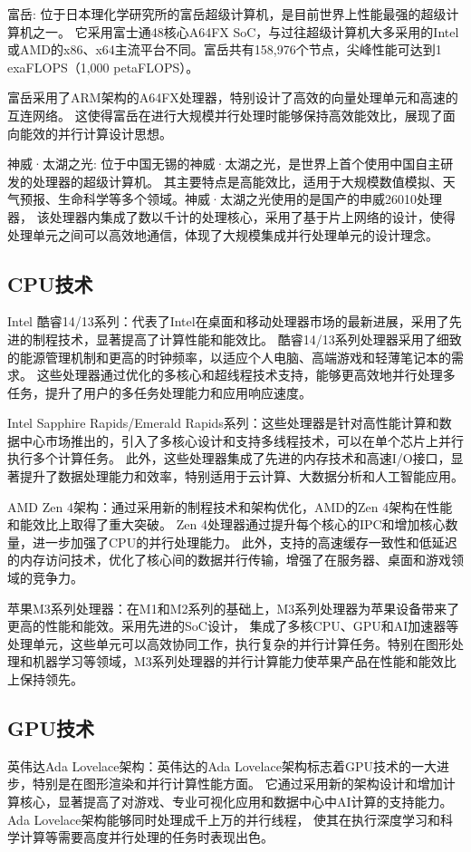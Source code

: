 \documentclass{ctexart}
\begin{document}
富岳: 位于日本理化学研究所的富岳超级计算机，是目前世界上性能最强的超级计算机之一。
它采用富士通48核心A64FX SoC，与过往超级计算机大多采用的Intel或AMD的x86、x64主流平台不同。富岳共有158,976个节点，尖峰性能可达到1 exaFLOPS（1,000 petaFLOPS）。\cite{fugaku1}

富岳采用了ARM架构的A64FX处理器，特别设计了高效的向量处理单元和高速的互连网络。\cite{fugaku2}
这使得富岳在进行大规模并行处理时能够保持高效能效比，展现了面向能效的并行计算设计思想。

神威·太湖之光: 位于中国无锡的神威·太湖之光，是世界上首个使用中国自主研发的处理器的超级计算机。
其主要特点是高能效比，适用于大规模数值模拟、天气预报、生命科学等多个领域。神威·太湖之光使用的是国产的申威26010处理器，
该处理器内集成了数以千计的处理核心，采用了基于片上网络的设计，使得处理单元之间可以高效地通信，体现了大规模集成并行处理单元的设计理念。
\subsection{CPU技术}
Intel 酷睿14/13系列：代表了Intel在桌面和移动处理器市场的最新进展，采用了先进的制程技术，显著提高了计算性能和能效比。
酷睿14/13系列处理器采用了细致的能源管理机制和更高的时钟频率，以适应个人电脑、高端游戏和轻薄笔记本的需求。
这些处理器通过优化的多核心和超线程技术支持，能够更高效地并行处理多任务，提升了用户的多任务处理能力和应用响应速度。

Intel Sapphire Rapids/Emerald Rapids系列：这些处理器是针对高性能计算和数据中心市场推出的，引入了多核心设计和支持多线程技术，可以在单个芯片上并行执行多个计算任务。
此外，这些处理器集成了先进的内存技术和高速I/O接口，显著提升了数据处理能力和效率，特别适用于云计算、大数据分析和人工智能应用。

AMD Zen 4架构：通过采用新的制程技术和架构优化，AMD的Zen 4架构在性能和能效比上取得了重大突破。
Zen 4处理器通过提升每个核心的IPC和增加核心数量，进一步加强了CPU的并行处理能力。
此外，支持的高速缓存一致性和低延迟的内存访问技术，优化了核心间的数据并行传输，增强了在服务器、桌面和游戏领域的竞争力。

苹果M3系列处理器：在M1和M2系列的基础上，M3系列处理器为苹果设备带来了更高的性能和能效。采用先进的SoC设计，
集成了多核CPU、GPU和AI加速器等处理单元，这些单元可以高效协同工作，执行复杂的并行计算任务。特别在图形处理和机器学习等领域，M3系列处理器的并行计算能力使苹果产品在性能和能效比上保持领先。
\subsection{GPU技术}
英伟达Ada Lovelace架构：英伟达的Ada Lovelace架构标志着GPU技术的一大进步，特别是在图形渲染和并行计算性能方面。
它通过采用新的架构设计和增加计算核心，显著提高了对游戏、专业可视化应用和数据中心中AI计算的支持能力。Ada Lovelace架构能够同时处理成千上万的并行线程，
使其在执行深度学习和科学计算等需要高度并行处理的任务时表现出色。
\end{document}
